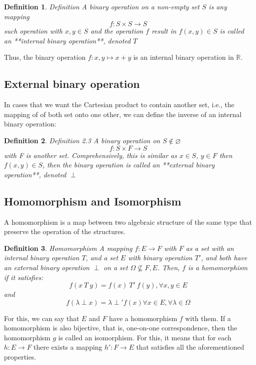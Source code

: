 \documentclass{book}
\newtheorem{Definition}{Definition}[section]
\numberwithin{identity}{subsection}
\numberwithin{Rule}{subsection}
\numberwithin{Theorem}{subsection}
\numberwithin{Definition}{subsection}
\begin{document}
\begin{Definition}
    Definition 
A binary operation on a non-empty set $S$ is any mapping $$f: S \times S \longrightarrow S$$ such operation with $x,y\in S$ and the operation $f$ result in $f(x,y)\in S$ is called an **internal binary operation**, denoted $T$
\end{Definition}

Thus, the binary operation $f: x,y\mapsto x+y$ is an internal binary operation in $\mathbb{R}$.

\subsection{External binary operation}

In cases that we want the Cartesian product to contain another set, i.e., the mapping of of both set onto one other, we can define the inverse of an internal binary operation: 

\begin{Definition}
     Definition 2.3
     A binary operation on $S\notin \varnothing$ $$f: S \times F \longrightarrow S$$ with F is another set. Comprehensively, this is similar as $x\in S$, $y \in F$ then $f(x,y)\in S$, then the binary operation is called an **external binary operation**, denoted $\perp$ 
\end{Definition}

\subsection{Homomorphism and Isomorphism}

A homomorphism is a map between two algebraic structure of the same type that preserve the operation of the structures. 

\begin{Definition}
    Homomorphism 
A mapping $f:E\longrightarrow F$ with $F$ as a set with an internal binary operation $T$, and a set $E$ with binary operation $T'$, and both have an external binary operation $\perp$ on a set $\Omega\not\subseteq F,E$. Then, $f$ is a homomorphism if it satisfies: $$f(x\:T\:y) = f(x)\:T'\:f(y), \forall x,y \in E$$ and $$f(\lambda \perp x) = \lambda \perp ' f(x) \forall x \in E, \forall \lambda \in \Omega$$
\end{Definition}

For this, we can say that $E$ and $F$ have a homomorphism $f$ with them. If a homomorphism is also bijective, that is, one-on-one correspondence, then the homomorphism $g$ is called an isomorphism. For this, it means that for each $h: E \longrightarrow F$ there exists a mapping $h':F\longrightarrow E$ that satisfies all the aforementioned properties.
\end{document}
